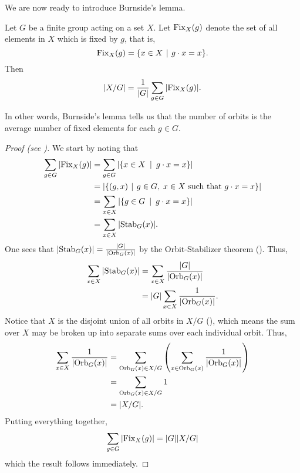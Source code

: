 We are now ready to introduce Burnside's lemma.
\begin{lemma}[Burnside]\label{lemma-burnside}
    Let $G$ be a finite group acting on a set $X$. Let $\mathrm{Fix}_{X}(g)$ denote the set of all elements in $X$ which is fixed by $g$, that is,
    \[
        \Fix{X}{g} = \{x \in X \vert g\cdot x = x\}.
    \]
    Then
    \[
        |X/G| = \frac{1}{|G|}\sum_{g\in G} |\mathrm{Fix}_{X}(g)|.
    \]
\end{lemma}
In other words, Burnside's lemma tells us that the number of orbits is the average number of fixed elements for each $g \in G$.
\begin{proof}[Proof (see \cite{proofwiki_burnsides-lemma})]
    We start by noting that
    \begin{align*}
        \sum_{g\in G} |\Fix{X}{g}| &= \sum_{g\in G} |\{x \in X \vertalt g\cdot x = x\}|\\
        &= |\{(g, x) \vert g \in G,\; x \in X \text{ such that } g\cdot x = x\}|\\
        &= \sum_{x\in X} |\{g \in G \vertalt g\cdot x = x\}|\\
        &= \sum_{x\in X} |\Stab{G}{x}|.
    \end{align*}
    One sees that $|\mathrm{Stab}_{G}(x)| = \frac{|G|}{|\mathrm{Orb}_{G}(x)|}$ by the Orbit-Stabilizer theorem (). Thus,
    \begin{align*}
        \sum_{x\in X} |\mathrm{Stab}_{G}(x)| &= \sum_{x\in X} \frac{|G|}{|\mathrm{Orb}_{G}(x)|}\\
        &= |G|\sum_{x\in X} \frac{1}{|\mathrm{Orb}_{G}(x)|}.
    \end{align*}
    Notice that $X$ is the disjoint union of all orbits in $X/G$ (), which means the sum over $X$ may be broken up into separate sums over each individual orbit. Thus,
    \begin{align*}
        \sum_{x\in X} \frac{1}{|\mathrm{Orb}_{G}(x)|} &= \sum_{\mathrm{Orb}_{G}(x) \in X/G}\left(\sum_{x \in \mathrm{Orb}_{G}(x)} \frac{1}{|\mathrm{Orb}_{G}(x)|}\right)\\
        &= \sum_{\mathrm{Orb}_{G}(x) \in X/G} 1\\
        &= |X/G|.
    \end{align*}
    Putting everything together,
    \[
        \sum_{g\in G} |\mathrm{Fix}_{X}(g)| = |G||X/G|
    \]
    which the result follows immediately.
\end{proof}

